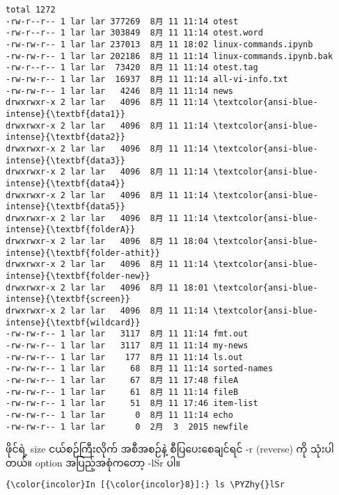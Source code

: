 \documentclass[11pt]{article}
\def\PYZhy{\char`\-}
\begin{document}
    \begin{Verbatim}[commandchars=\\\{\}]
total 1272
-rw-r--r-- 1 lar lar 377269  8月 11 11:14 otest
-rw-r--r-- 1 lar lar 303849  8月 11 11:14 otest.word
-rw-rw-r-- 1 lar lar 237013  8月 11 18:02 linux-commands.ipynb
-rw-rw-r-- 1 lar lar 202186  8月 11 11:14 linux-commands.ipynb.bak
-rw-r--r-- 1 lar lar  73420  8月 11 11:14 otest.tag
-rw-rw-r-- 1 lar lar  16937  8月 11 11:14 all-vi-info.txt
-rw-rw-r-- 1 lar lar   4246  8月 11 11:14 news
drwxrwxr-x 2 lar lar   4096  8月 11 11:14 \textcolor{ansi-blue-intense}{\textbf{data1}}
drwxrwxr-x 2 lar lar   4096  8月 11 11:14 \textcolor{ansi-blue-intense}{\textbf{data2}}
drwxrwxr-x 2 lar lar   4096  8月 11 11:14 \textcolor{ansi-blue-intense}{\textbf{data3}}
drwxrwxr-x 2 lar lar   4096  8月 11 11:14 \textcolor{ansi-blue-intense}{\textbf{data4}}
drwxrwxr-x 2 lar lar   4096  8月 11 11:14 \textcolor{ansi-blue-intense}{\textbf{data5}}
drwxrwxr-x 2 lar lar   4096  8月 11 11:14 \textcolor{ansi-blue-intense}{\textbf{folderA}}
drwxrwxr-x 2 lar lar   4096  8月 11 18:04 \textcolor{ansi-blue-intense}{\textbf{folder-athit}}
drwxrwxr-x 2 lar lar   4096  8月 11 11:14 \textcolor{ansi-blue-intense}{\textbf{folder-new}}
drwxrwxr-x 2 lar lar   4096  8月 11 18:01 \textcolor{ansi-blue-intense}{\textbf{screen}}
drwxrwxr-x 2 lar lar   4096  8月 11 11:14 \textcolor{ansi-blue-intense}{\textbf{wildcard}}
-rw-rw-r-- 1 lar lar   3117  8月 11 11:14 fmt.out
-rw-rw-r-- 1 lar lar   3117  8月 11 11:14 my-news
-rw-rw-r-- 1 lar lar    177  8月 11 11:14 ls.out
-rw-rw-r-- 1 lar lar     68  8月 11 11:14 sorted-names
-rw-rw-r-- 1 lar lar     67  8月 11 17:48 fileA
-rw-rw-r-- 1 lar lar     61  8月 11 11:14 fileB
-rw-rw-r-- 1 lar lar     51  8月 11 17:46 item-list
-rw-rw-r-- 1 lar lar      0  8月 11 11:14 echo
-rw-rw-r-- 1 lar lar      0  2月  3  2015 newfile

    \end{Verbatim}

    ဖိုင်ရဲ့ size ငယ်စဉ်ကြီးလိုက် အစီအစဉ်နဲ့ စီပြပေးစေချင်ရင် -r (reverse)
ကို သုံးပါတယ်။ option အပြည့်အစုံကတော့ -lSr ပါ။

    \begin{Verbatim}[commandchars=\\\{\}]
{\color{incolor}In [{\color{incolor}8}]:} ls \PYZhy{}lSr
\end{Verbatim}
\end{document}

